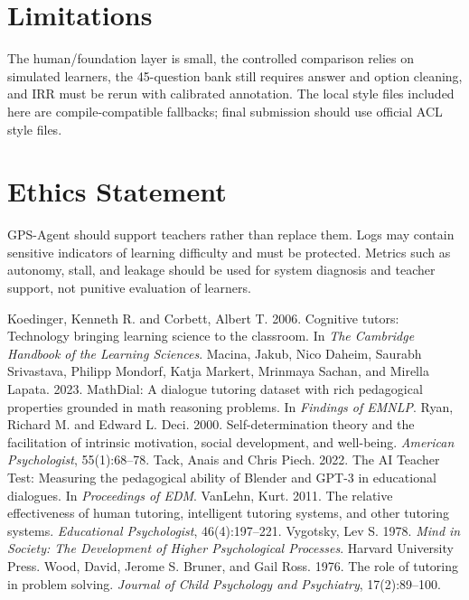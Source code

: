 \documentclass[11pt]{article}
\begin{document}
\section{Limitations}
The human/foundation layer is small, the controlled comparison relies on simulated learners, the 45-question bank still requires answer and option cleaning, and IRR must be rerun with calibrated annotation. The local style files included here are compile-compatible fallbacks; final submission should use official ACL style files.

\section{Ethics Statement}
GPS-Agent should support teachers rather than replace them. Logs may contain sensitive indicators of learning difficulty and must be protected. Metrics such as autonomy, stall, and leakage should be used for system diagnosis and teacher support, not punitive evaluation of learners.

\begin{thebibliography}{}
Koedinger, Kenneth R. and Corbett, Albert T. 2006. Cognitive tutors: Technology bringing learning science to the classroom. In \emph{The Cambridge Handbook of the Learning Sciences}.
Macina, Jakub, Nico Daheim, Saurabh Srivastava, Philipp Mondorf, Katja Markert, Mrinmaya Sachan, and Mirella Lapata. 2023. MathDial: A dialogue tutoring dataset with rich pedagogical properties grounded in math reasoning problems. In \emph{Findings of EMNLP}.
Ryan, Richard M. and Edward L. Deci. 2000. Self-determination theory and the facilitation of intrinsic motivation, social development, and well-being. \emph{American Psychologist}, 55(1):68--78.
Tack, Anais and Chris Piech. 2022. The AI Teacher Test: Measuring the pedagogical ability of Blender and GPT-3 in educational dialogues. In \emph{Proceedings of EDM}.
VanLehn, Kurt. 2011. The relative effectiveness of human tutoring, intelligent tutoring systems, and other tutoring systems. \emph{Educational Psychologist}, 46(4):197--221.
Vygotsky, Lev S. 1978. \emph{Mind in Society: The Development of Higher Psychological Processes}. Harvard University Press.
Wood, David, Jerome S. Bruner, and Gail Ross. 1976. The role of tutoring in problem solving. \emph{Journal of Child Psychology and Psychiatry}, 17(2):89--100.
\end{thebibliography}
\end{document}
